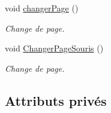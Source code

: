 \begin{DoxyCompactItemize}
void \hyperlink{class_s_f_m_l_pokedex_a94f3d84825cc9bac5efff4123b7cc154}{changer\+Page} ()
\begin{DoxyCompactList}\small\item\em Change de page. \end{DoxyCompactList}\item 
void \hyperlink{class_s_f_m_l_pokedex_a9528e644324e4b4c6f0b0a3e7fcdde79}{Changer\+Page\+Souris} ()
\begin{DoxyCompactList}\small\item\em Change de page. \end{DoxyCompactList}\end{DoxyCompactItemize}
\subsection*{Attributs privés}
